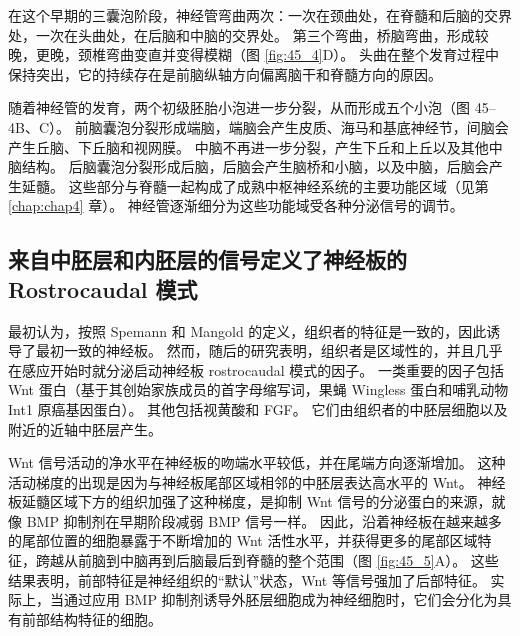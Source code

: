 在这个早期的三囊泡阶段，神经管弯曲两次：一次在颈曲处，在脊髓和后脑的交界处，一次在头曲处，在后脑和中脑的交界处。
第三个弯曲，桥脑弯曲，形成较晚，更晚，颈椎弯曲变直并变得模糊（图 \ref{fig:45_4}D）。 头曲在整个发育过程中保持突出，它的持续存在是前脑纵轴方向偏离脑干和脊髓方向的原因。

随着神经管的发育，两个初级胚胎小泡进一步分裂，从而形成五个小泡（图 45–4B、C）。 前脑囊泡分裂形成端脑，端脑会产生皮质、海马和基底神经节，间脑会产生丘脑、下丘脑和视网膜。 中脑不再进一步分裂，产生下丘和上丘以及其他中脑结构。 后脑囊泡分裂形成后脑，后脑会产生脑桥和小脑，以及中脑，后脑会产生延髓。 这些部分与脊髓一起构成了成熟中枢神经系统的主要功能区域（见第 \ref{chap:chap4} 章）。 神经管逐渐细分为这些功能域受各种分泌信号的调节。

\subsection{来自中胚层和内胚层的信号定义了神经板的 Rostrocaudal 模式}
最初认为，按照 Spemann 和 Mangold 的定义，组织者的特征是一致的，因此诱导了最初一致的神经板。 然而，随后的研究表明，组织者是区域性的，并且几乎在感应开始时就分泌启动神经板 rostrocaudal 模式的因子。 一类重要的因子包括 Wnt 蛋白（基于其创始家族成员的首字母缩写词，果蝇 Wingless 蛋白和哺乳动物 Int1 原癌基因蛋白）。 其他包括视黄酸和 FGF。 它们由组织者的中胚层细胞以及附近的近轴中胚层产生。

Wnt 信号活动的净水平在神经板的吻端水平较低，并在尾端方向逐渐增加。 这种活动梯度的出现是因为与神经板尾部区域相邻的中胚层表达高水平的 Wnt。 神经板延髓区域下方的组织加强了这种梯度，是抑制 Wnt 信号的分泌蛋白的来源，就像 BMP 抑制剂在早期阶段减弱 BMP 信号一样。 
因此，沿着神经板在越来越多的尾部位置的细胞暴露于不断增加的 Wnt 活性水平，并获得更多的尾部区域特征，跨越从前脑到中脑再到后脑最后到脊髓的整个范围（图 \ref{fig:45_5}A）。 
这些结果表明，前部特征是神经组织的“默认”状态，Wnt 等信号强加了后部特征。 实际上，当通过应用 BMP 抑制剂诱导外胚层细胞成为神经细胞时，它们会分化为具有前部结构特征的细胞。

